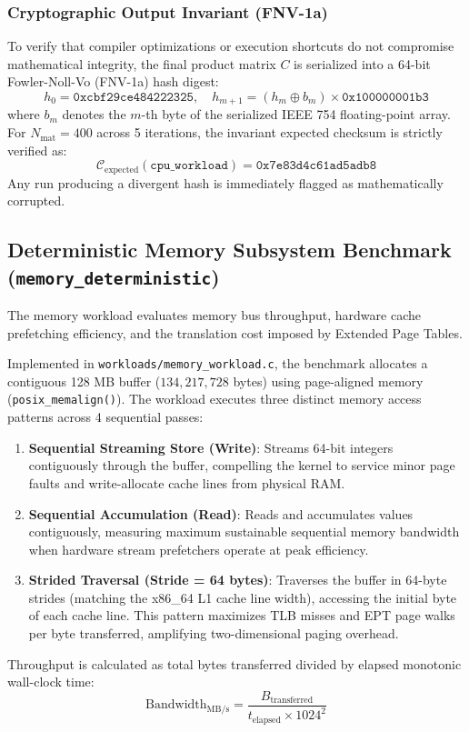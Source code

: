 \subsubsection{Cryptographic Output Invariant (FNV-1a)}
To verify that compiler optimizations or execution shortcuts do not compromise mathematical integrity, the final product matrix $C$ is serialized into a 64-bit Fowler-Noll-Vo (FNV-1a) hash digest:
\begin{equation}
    h_0 = \texttt{0xcbf29ce484222325}, \quad h_{m+1} = (h_m \oplus b_m) \times \texttt{0x100000001b3}
\end{equation}
where $b_m$ denotes the $m$-th byte of the serialized IEEE 754 floating-point array. For $N_{\text{mat}} = 400$ across 5 iterations, the invariant expected checksum is strictly verified as:
\begin{equation}
    \mathcal{C}_{\text{expected}}(\texttt{cpu\_workload}) = \texttt{0x7e83d4c61ad5adb8}
\end{equation}
Any run producing a divergent hash is immediately flagged as mathematically corrupted.

\subsection{Deterministic Memory Subsystem Benchmark (\texttt{memory\_deterministic})}
\label{subsec:memory_methodology}

The memory workload evaluates memory bus throughput, hardware cache prefetching efficiency, and the translation cost imposed by Extended Page Tables.

Implemented in \texttt{workloads/}\allowbreak\texttt{memory\_}\allowbreak\texttt{workload.c}, the benchmark allocates a contiguous 128 MB buffer ($134,217,728$ bytes) using page-aligned memory (\texttt{posix\_memalign()}). The workload executes three distinct memory access patterns across 4 sequential passes:
\begin{enumerate}
    \item \textbf{Sequential Streaming Store (Write)}: Streams 64-bit integers contiguously through the buffer, compelling the kernel to service minor page faults and write-allocate cache lines from physical RAM.
    \item \textbf{Sequential Accumulation (Read)}: Reads and accumulates values contiguously, measuring maximum sustainable sequential memory bandwidth when hardware stream prefetchers operate at peak efficiency.
    \item \textbf{Strided Traversal (Stride = 64 bytes)}: Traverses the buffer in 64-byte strides (matching the x86\_64 L1 cache line width), accessing the initial byte of each cache line. This pattern maximizes TLB misses and EPT page walks per byte transferred, amplifying two-dimensional paging overhead.
\end{enumerate}
Throughput is calculated as total bytes transferred divided by elapsed monotonic wall-clock time:
\begin{equation}
    \text{Bandwidth}_{\text{MB/s}} = \frac{B_{\text{transferred}}}{t_{\text{elapsed}} \times 1024^2}
\end{equation}

